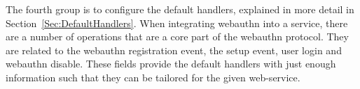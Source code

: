 



The fourth group is to configure the default handlers, explained in more detail in Section~\ref{Sec:DefaultHandlers}. When integrating webauthn into a service, there are a number of operations that are a core part of the webauthn protocol. They are related to the webauthn registration event, the setup event, user login and webauthn disable. These fields provide the default handlers with just enough information such that they can be tailored for the given web-service.







